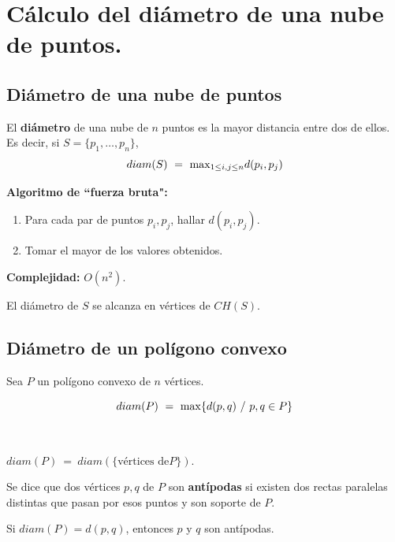 \documentclass[twoside]{report}
\begin{document}
\section{Cálculo del diámetro de una nube de puntos.}

\subsection{Diámetro de una nube de puntos}

\begin{defi} El \textbf{diámetro} de una nube de $n$
puntos es la mayor distancia entre dos de ellos. Es decir, si
$S=\{p_1,\dots,p_n\}$, $$diam(S) \ = \ \displaystyle{{\rm max}_{1\leq i,j \leq
n}}d(p_i,p_j)$$
\end{defi}

{\bf Algoritmo de ``fuerza bruta":}

\begin{enumerate}
  \item Para cada par de puntos $p_i,p_j$, hallar $d(p_i,p_j)$.
  \item Tomar el mayor de los valores obtenidos.
\end{enumerate}

{\bf Complejidad:} $O(n^2)$.

\begin{prop} El diámetro de $S$ se alcanza en vértices
de $CH(S)$.
\end{prop}

\subsection{Diámetro de un polígono convexo}

Sea $P$ un polígono convexo de $n$ vértices.

 $$diam(P)\ = \ {\rm max}\{d(p,q)\ / \ p,q \in P\}$$

\

\begin{prop} $diam(P) \ = \  diam(\{\mbox{vértices de
}P\})$.
\end{prop}

\begin{defi} Se dice que dos vértices $p,q$ de $P$ son
\textbf{antípodas} si existen dos rectas paralelas distintas que
pasan por esos puntos y son soporte de $P$.
\end{defi}

\begin{prop} Si $diam(P)=d(p,q)$, entonces $p$ y $q$
son antípodas.
\end{prop}
\end{document}
